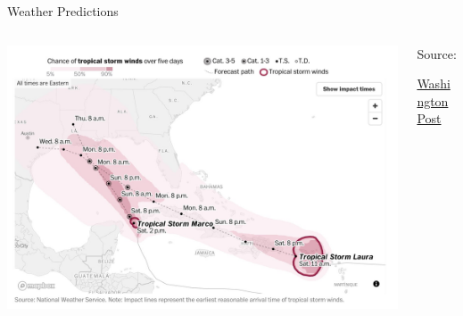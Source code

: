 \documentclass[aspectratio=169,t,11pt,table]{beamer}
\begin{document}
\begin{frame}{Weather Predictions}
  \begin{columns}[T]
    \begin{column}{.7\textwidth}\vspace*{-\bigskipamount}
      \includegraphics[width = \textwidth]{figures/hurricane.jpg}
    \end{column}
    \begin{column}{.3\textwidth}
      Source:

      \href{https://www.washingtonpost.com/weather/2020/08/21/gulf-coast-hurricanes/}{Washington Post}
    \end{column}
  \end{columns}
\end{frame}
\end{document}

